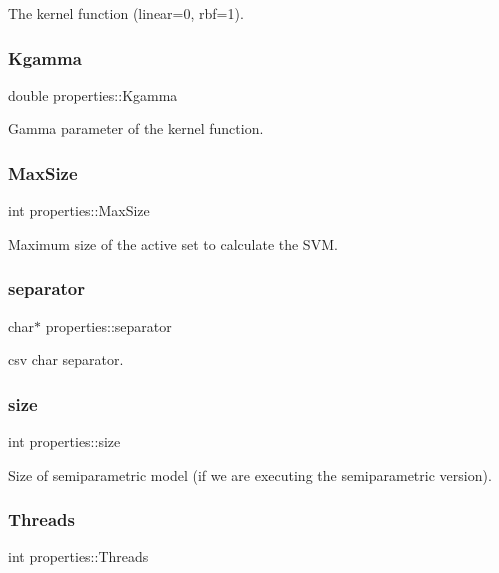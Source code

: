 The kernel function (linear=0, rbf=1). \hypertarget{structproperties_aab9c0195a446f08fc782701750ddb6ac}{}\label{structproperties_aab9c0195a446f08fc782701750ddb6ac} 
\subsubsection{\texorpdfstring{Kgamma}{Kgamma}}
{\ttfamily double properties\+::\+Kgamma}

Gamma parameter of the kernel function. \hypertarget{structproperties_a42219768dd35e1ab628e1785759df400}{}\label{structproperties_a42219768dd35e1ab628e1785759df400} 
\subsubsection{\texorpdfstring{Max\+Size}{MaxSize}}
{\ttfamily int properties\+::\+Max\+Size}

Maximum size of the active set to calculate the S\+VM. \hypertarget{structproperties_a0d357070dcbbf50ac0a7ef0fdeaad80a}{}\label{structproperties_a0d357070dcbbf50ac0a7ef0fdeaad80a} 
\subsubsection{\texorpdfstring{separator}{separator}}
{\ttfamily char$\ast$ properties\+::separator}

csv char separator. \hypertarget{structproperties_a1694aebbbdd904f9b0e5faca725966b6}{}\label{structproperties_a1694aebbbdd904f9b0e5faca725966b6} 
\subsubsection{\texorpdfstring{size}{size}}
{\ttfamily int properties\+::size}

Size of semiparametric model (if we are executing the semiparametric version). \hypertarget{structproperties_a56ab77c44fb808e71990074bd75529ed}{}\label{structproperties_a56ab77c44fb808e71990074bd75529ed} 
\subsubsection{\texorpdfstring{Threads}{Threads}}
{\ttfamily int properties\+::\+Threads}

